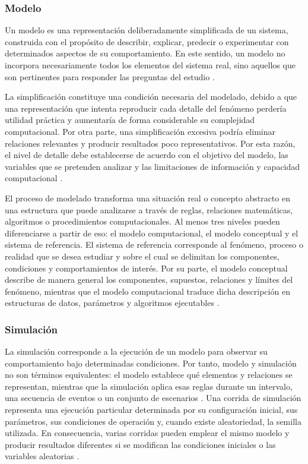 \subsubsection{Modelo}

Un modelo es una representación deliberadamente simplificada de un sistema, construida con el propósito de describir, explicar, predecir o experimentar con determinados aspectos de su comportamiento. En este sentido, un modelo no incorpora necesariamente todos los elementos del sistema real, sino aquellos que son pertinentes para responder las preguntas del estudio \cite{law2015simulation}. 

La simplificación constituye una condición necesaria del modelado, debido a que una representación que intenta reproducir cada detalle del fenómeno perdería utilidad práctica y aumentaría de forma considerable su complejidad computacional. Por otra parte, una simplificación excesiva podría eliminar relaciones relevantes y producir resultados poco representativos. Por esta razón, el nivel de detalle debe establecerse de acuerdo con el objetivo del modelo, las variables que se pretenden analizar y las limitaciones de información y capacidad computacional \cite{law2015simulation}.

El proceso de modelado transforma una situación real o concepto abstracto en una estructura que puede analizarse a través de reglas, relaciones matemáticas, algoritmos o procedimientos computacionales. Al menos tres niveles pueden diferenciarse a partir de eso: el modelo computacional, el modelo conceptual y el sistema de referencia. El sistema de referencia corresponde al fenómeno, proceso o realidad que se desea estudiar y sobre el cual se delimitan los componentes, condiciones y comportamientos de interés. Por su parte, el modelo conceptual describe de manera general los componentes, supuestos, relaciones y límites del fenómeno, mientras que el modelo computacional traduce dicha descripción en estructuras de datos, parámetros y algoritmos ejecutables \cite{bungartz2014modeling,law2015simulation}. 

\subsubsection{Simulación}

La simulación corresponde a la ejecución de un modelo para observar su comportamiento bajo determinadas condiciones. Por tanto, modelo y simulación no son términos equivalentes: el modelo establece qué elementos y relaciones se representan, mientras que la simulación aplica esas reglas durante un intervalo, una secuencia de eventos o un conjunto de escenarios \cite{banks2010discrete,law2015simulation}. Una corrida de simulación representa una ejecución particular determinada por su configuración inicial, sus parámetros, sus condiciones de operación y, cuando existe aleatoriedad, la semilla utilizada. En consecuencia, varias corridas pueden emplear el mismo modelo y producir resultados diferentes si se modifican las condiciones iniciales o las variables aleatorias \cite{law2015simulation}.

